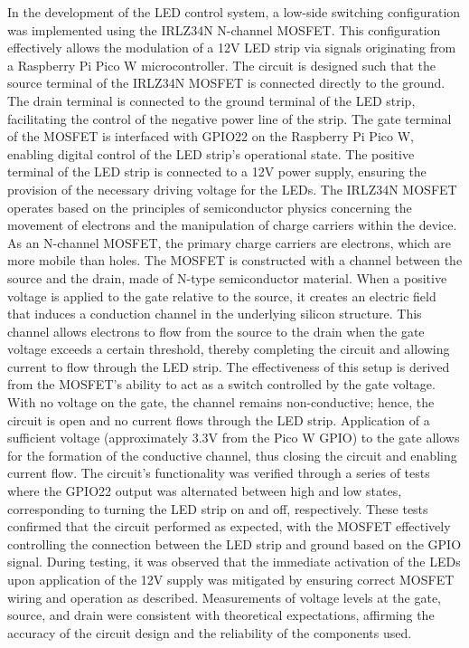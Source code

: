 \documentclass[12pt]{article}
\begin{document}
\noindent In the development of the LED control system, a low-side switching configuration was implemented using the IRLZ34N N-channel MOSFET. This configuration effectively allows the modulation of a 12V LED strip via signals originating from a Raspberry Pi Pico W microcontroller. The circuit is designed such that the source terminal of the IRLZ34N MOSFET is connected directly to the ground. The drain terminal is connected to the ground terminal of the LED strip, facilitating the control of the negative power line of the strip. The gate terminal of the MOSFET is interfaced with GPIO22 on the Raspberry Pi Pico W, enabling digital control of the LED strip’s operational state. The positive terminal of the LED strip is connected to a 12V power supply, ensuring the provision of the necessary driving voltage for the LEDs.
\newline
\newline
\noindent The IRLZ34N MOSFET operates based on the principles of semiconductor physics concerning the movement of electrons and the manipulation of charge carriers within the device. As an N-channel MOSFET, the primary charge carriers are electrons, which are more mobile than holes. The MOSFET is constructed with a channel between the source and the drain, made of N-type semiconductor material. When a positive voltage is applied to the gate relative to the source, it creates an electric field that induces a conduction channel in the underlying silicon structure. This channel allows electrons to flow from the source to the drain when the gate voltage exceeds a certain threshold, thereby completing the circuit and allowing current to flow through the LED strip.
\newline
\newline
\noindent The effectiveness of this setup is derived from the MOSFET's ability to act as a switch controlled by the gate voltage. With no voltage on the gate, the channel remains non-conductive; hence, the circuit is open and no current flows through the LED strip. Application of a sufficient voltage (approximately 3.3V from the Pico W GPIO) to the gate allows for the formation of the conductive channel, thus closing the circuit and enabling current flow.
\newline
\newline
The circuit's functionality was verified through a series of tests where the GPIO22 output was alternated between high and low states, corresponding to turning the LED strip on and off, respectively. These tests confirmed that the circuit performed as expected, with the MOSFET effectively controlling the connection between the LED strip and ground based on the GPIO signal. During testing, it was observed that the immediate activation of the LEDs upon application of the 12V supply was mitigated by ensuring correct MOSFET wiring and operation as described. Measurements of voltage levels at the gate, source, and drain were consistent with theoretical expectations, affirming the accuracy of the circuit design and the reliability of the components used.
\end{document}
